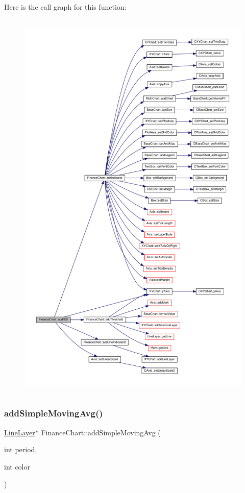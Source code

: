 Here is the call graph for this function\+:
\nopagebreak
\begin{figure}[H]
\begin{center}
\leavevmode
\includegraphics[height=550pt]{class_finance_chart_aba175ac4bc80577bad0767bcd75109c7_cgraph}
\end{center}
\end{figure}
\mbox{\label{class_finance_chart_a7fdf86b7ceb129bd035612be20fbe6ba}} 
\subsubsection{\texorpdfstring{add\+Simple\+Moving\+Avg()}{addSimpleMovingAvg()}}
{\footnotesize\ttfamily \hyperlink{class_line_layer}{Line\+Layer}$\ast$ Finance\+Chart\+::add\+Simple\+Moving\+Avg (\begin{DoxyParamCaption}\item[{int}]{period,  }\item[{int}]{color }\end{DoxyParamCaption})\hspace{0.3cm}{\ttfamily [inline]}}



